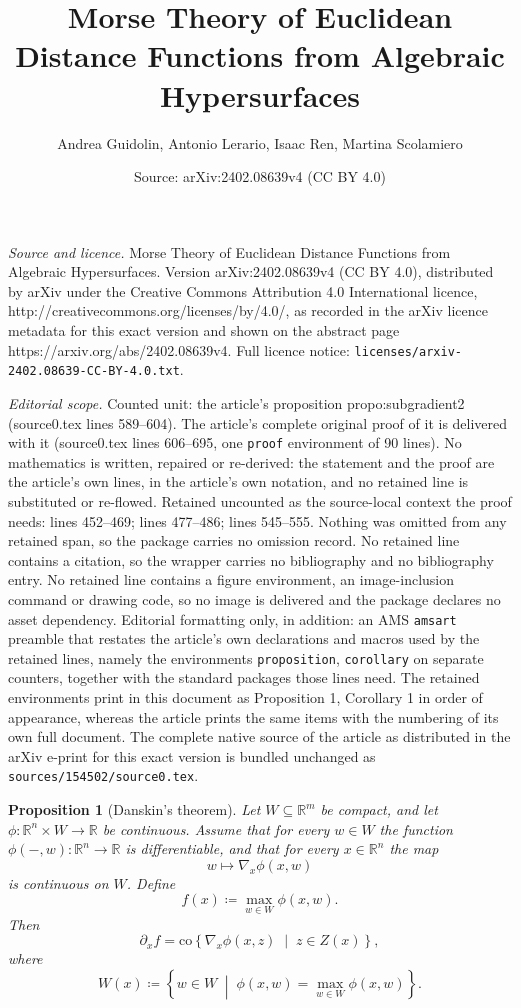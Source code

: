 \documentclass[10pt,a4paper]{amsart}
\title{Morse Theory of Euclidean Distance Functions from Algebraic Hypersurfaces}
\author{Andrea Guidolin, Antonio Lerario, Isaac Ren, Martina Scolamiero}
\date{Source: arXiv:2402.08639v4 (CC BY 4.0)}
\newtheorem{proposition}{Proposition}
\newcommand{\R}{\mathbb{R}}
\begin{document}
\maketitle

\noindent\emph{Source and licence.} Morse Theory of Euclidean Distance Functions from Algebraic Hypersurfaces. Version arXiv:2402.08639v4 (CC BY 4.0), distributed by arXiv under the Creative Commons Attribution 4.0 International licence, http://creativecommons.org/licenses/by/4.0/, as recorded in the arXiv licence metadata for this exact version and shown on the abstract page https://arxiv.org/abs/2402.08639v4. Full licence notice: \texttt{licenses/arxiv-2402.08639-CC-BY-4.0.txt}.\par\smallskip

\noindent\textit{Editorial scope.} Counted unit: the article's proposition propo:subgradient2 (source0.tex lines 589--604). The article's complete original proof of it is delivered with it (source0.tex lines 606--695, one \texttt{proof} environment of 90 lines). No mathematics is written, repaired or re-derived: the statement and the proof are the article's own lines, in the article's own notation, and no retained line is substituted or re-flowed.  Retained uncounted as the source-local context the proof needs: lines 452--469; lines 477--486; lines 545--555.  Nothing was omitted from any retained span, so the package carries no omission record.  No retained line contains a citation, so the wrapper carries no bibliography and no bibliography entry.  No retained line contains a figure environment, an image-inclusion command or drawing code, so no image is delivered and the package declares no asset dependency.  Editorial formatting only, in addition: an AMS \texttt{amsart} preamble that restates the article's own declarations and macros used by the retained lines, namely the environments \texttt{proposition}, \texttt{corollary} on separate counters, together with the standard packages those lines need.  The retained environments print in this document as Proposition 1, Corollary 1 in order of appearance, whereas the article prints the same items with the numbering of its own full document.  The complete native source of the article as distributed in the arXiv e-print for this exact version is bundled unchanged as \texttt{sources/154502/source0.tex}.
\begin{proposition}[Danskin's theorem]\label{P:danskin}
Let $W \subseteq \R^m$ be compact, and let $\phi \colon \R^n \times W \to \R$ be continuous. Assume that for every $w \in W$ the function $\phi(-,w)\colon \R^n \to \R$ is differentiable, and that for every $x \in \R^n$ the map
\[
w \mapsto \nabla_x \phi(x,w)
\]
is continuous on $W$. Define
\[
f(x) \coloneqq \max_{w \in W} \phi(x,w).
\]
Then
\[
\partial_x f = \mathrm{co}\left\{ \nabla_x \phi(x,z) \;\middle|\; z \in Z(x)\right\},
\]
where
\[
W(x) \coloneqq \left\{ w \in W \;\middle|\; \phi(x,w)=\max_{w \in W}\phi(x,w)\right\}.
\]
\end{proposition}
\end{document}
